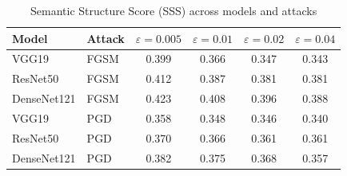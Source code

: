 \begin{table}[h]
\centering
\caption{Semantic Structure Score (SSS) across models and attacks}
\begin{tabular}{llcccc}
\toprule
Model & Attack & $\varepsilon=0.005$ & $\varepsilon=0.01$ & $\varepsilon=0.02$ & $\varepsilon=0.04$ \\
\midrule
VGG19 & FGSM & 0.399 & 0.366 & 0.347 & 0.343 \\
ResNet50 & FGSM & 0.412 & 0.387 & 0.381 & 0.381 \\
DenseNet121 & FGSM & 0.423 & 0.408 & 0.396 & 0.388 \\
\midrule
VGG19 & PGD & 0.358 & 0.348 & 0.346 & 0.340 \\
ResNet50 & PGD & 0.370 & 0.366 & 0.361 & 0.361 \\
DenseNet121 & PGD & 0.382 & 0.375 & 0.368 & 0.357 \\
\bottomrule
\end{tabular}
\end{table}
